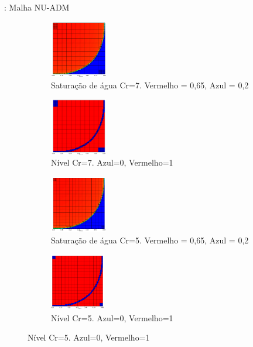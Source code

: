 \documentclass[professionalfont]{beamer}
\begin{document}
\begin{frame}{\FrameProblemName: {\small Malha NU-ADM}}
    \begin{figure}[!htbp]
        \centering
        \begin{subfigure}{.48\textwidth}
            \centering
            \includegraphics[height=2.5cm]{./imgs/pr4/sat_cr7.png}
            \caption{Saturação de água Cr=7. Vermelho = 0,65, Azul = 0,2}
        \end{subfigure}
        \hfill
        \begin{subfigure}{.48\textwidth}
            \centering
            \includegraphics[height=2.5cm]{./imgs/pr4/nivel_cr7.png}
            \caption{Nível Cr=7. Azul=0, Vermelho=1}
        \end{subfigure}
        \bigskip
        \begin{subfigure}{.48\textwidth}
            \centering
            \includegraphics[height=2.5cm]{./imgs/pr4/sat_cr5.png}
            \caption{Saturação de água Cr=5. Vermelho = 0,65, Azul = 0,2}
        \end{subfigure}
        \hfill
        \begin{subfigure}{.48\textwidth}
            \centering
            \includegraphics[height=2.5cm]{./imgs/pr4/nivel_cr5.png}
            \caption{Nível Cr=5. Azul=0, Vermelho=1}
        \end{subfigure}
    
        \label{fig:fig7_pr4}
    \end{figure}
\end{frame}
\end{document}

